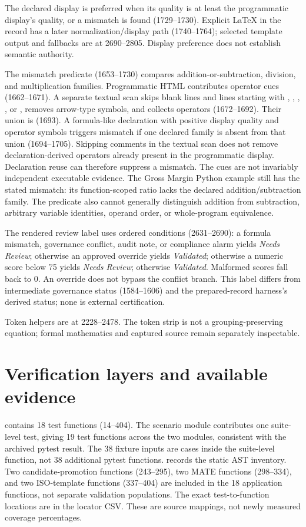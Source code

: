 \documentclass[10pt,a4paper]{article}
\newcommand{\code}[1]{\path{#1}}
\begin{document}
The declared display is preferred when its quality is at least the programmatic display's quality, or a mismatch is found (1729--1730). Explicit LaTeX in the record has a later normalization/display path (1740--1764); selected template output and fallbacks are at 2690--2805. Display preference does not establish semantic authority.

The mismatch predicate (1653--1730) compares addition-or-subtraction, division, and multiplication families. Programmatic HTML contributes operator cues (1662--1671). A separate textual scan skips blank lines and lines starting with \code{--}, \code{#}, \code{//}, \code{'}, or \code{*}, removes arrow-type symbols, and collects operators (1672--1692). Their union is \code{evidence_ops} (1693). A formula-like declaration with positive display quality and operator symbols triggers mismatch if one declared family is absent from that union (1694--1705). Skipping comments in the textual scan does not remove declaration-derived operators already present in the programmatic display. Declaration reuse can therefore suppress a mismatch. The cues are not invariably independent executable evidence. The Gross Margin Python example still has the stated mismatch: its function-scoped ratio lacks the declared addition/subtraction family. The predicate also cannot generally distinguish addition from subtraction, arbitrary variable identities, operand order, or whole-program equivalence.

The rendered review label uses ordered conditions (2631--2690): a formula mismatch, governance conflict, audit note, or compliance alarm yields \emph{Needs Review}; otherwise an approved override yields \emph{Validated}; otherwise a numeric score below 75 yields \emph{Needs Review}; otherwise \emph{Validated}. Malformed scores fall back to 0. An override does not bypass the conflict branch. This label differs from intermediate governance status (1584--1606) and the prepared-record harness's derived status; none is external certification.

Token helpers are at 2228--2478. The token strip is not a grouping-preserving equation; formal mathematics and captured source remain separately inspectable.

\clearpage
\section{Verification layers and available evidence}
\code{test_app.py} contains 18 test functions (14--404). The scenario module contributes one suite-level test, giving 19 test functions across the two modules, consistent with the archived pytest result. The 38 fixture inputs are cases inside the suite-level function, not 38 additional pytest functions. \code{TEST_COUNT_SOURCE_AUDIT.json} records the static AST inventory. Two candidate-promotion functions (243--295), two MATE functions (298--334), and two ISO-template functions (337--404) are included in the 18 application functions, not separate validation populations. The exact test-to-function locations are in the locator CSV. These are source mappings, not newly measured coverage percentages.
\end{document}
